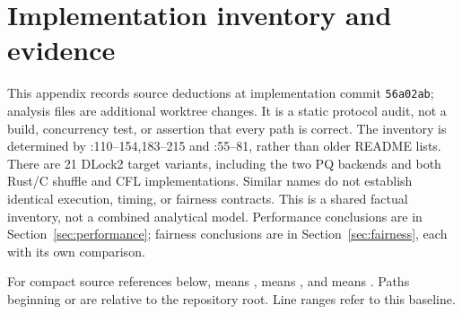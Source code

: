 \section{Implementation inventory and evidence}
\label{app:inventory}
This appendix records source deductions at implementation commit
\texttt{56a02ab}; analysis files are additional worktree changes. It is a static
protocol audit, not a build, concurrency test, or assertion that every path
is correct. The inventory is determined by
:110--154,183--215 and
:55--81, rather than older README lists.
There are 21 DLock2 target variants, including the two PQ backends and both
Rust/C shuffle and CFL implementations. Similar names do not establish
identical execution, timing, or fairness contracts.
This is a shared factual inventory, not a combined analytical model.
Performance conclusions are in Section~\ref{sec:performance}; fairness
conclusions are in Section~\ref{sec:fairness}, each with its own comparison.

For compact source references below,  means
,  means
, and  means
. Paths beginning  or  are
relative to the repository root. Line ranges refer to this baseline.

